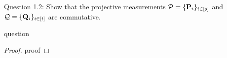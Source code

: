 \begin{solution}{Question 1.2: Show that the projective measurements $\mathcal{P} = \{\mathbf{P}_i \}_{i\in[s]}$ and $\mathcal{Q} = \{\mathbf{Q}_i \}_{i\in[t]}$ are
commutative.}\label{ques:x}
    \begin{question}
    question
    \end{question}
    \tcblower{}
    \begin{proof}
    proof
    \end{proof}
\end{solution}
